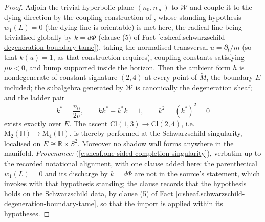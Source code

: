 \documentclass[11pt]{article}
\theoremstyle{definition}
\theoremstyle{plain}
\providecommand{\Cl}{}\renewcommand{\Cl}{\mathrm{Cl}}
\providecommand{\HH}{}\renewcommand{\HH}{\mathbb{H}}
\providecommand{\Mat}{}\renewcommand{\Mat}{\mathrm{M}}
\providecommand{\Mt}{}\renewcommand{\Mt}{\widetilde{M}}
\providecommand{\R}{}\renewcommand{\R}{\mathbb{R}}
\providecommand{\nInf}{}\renewcommand{\nInf}{n_\infty}
\providecommand{\nO}{}\renewcommand{\nO}{n_0}
\providecommand{\shL}{}\renewcommand{\shL}{L}
\providecommand{\shW}{}\renewcommand{\shW}{\mathcal{W}}
\begin{document}
\begin{proof}
Adjoin the trivial hyperbolic plane $(\nO, \nInf)$ to $\shW$ and couple it to the dying direction by the coupling construction of \cite[Def.~4.1]{ButlerT4}, whose standing hypothesis $w_1(\shL) = 0$ (the dying line is orientable) is met here, the radical line being trivialised globally by $k = d\Phi$ (clause (5) of Fact \ref{c:sheaf.schwarzschild-degeneration-boundary-tame}), taking the normalised transversal $u = \partial_t/m$ (so that $k(u) = 1$, as that construction requires), coupling constants satisfying $\mu\nu < 0$, and bump supported inside the horizon. Then the ambient form $h$ is nondegenerate of constant signature $(2,4)$ at every point of $\Mt$, the boundary $E$ included; the subalgebra generated by $\shW$ is canonically the degeneration sheaf; and the ladder pair
\[
k^* = \frac{\nO}{2\nu}, \qquad k k^* + k^* k = 1, \qquad k^2 = (k^*)^2 = 0
\]
exists exactly over $E$. The ascent $\Cl(1,3) \to \Cl(2,4)$, i.e.\ $\Mat_2(\HH) \to \Mat_4(\HH)$, is thereby performed at the Schwarzschild singularity, localised on $E \cong \R \times S^2$. Moreover no shadow wall forms anywhere in the manifold.
\emph{Provenance:} \cite[Thm.~8.12]{ButlerT4} (\ref{c:sheaf.one-sided-completion-singularity}), verbatim up to the recorded notational alignment, with one clause added here: the parenthetical $w_1(\shL) = 0$ and its discharge by $k = d\Phi$ are not in the source's statement, which invokes \cite[Def.~4.1]{ButlerT4} with that hypothesis standing; the clause records that the hypothesis holds on the Schwarzschild data, by clause (5) of Fact \ref{c:sheaf.schwarzschild-degeneration-boundary-tame}, so that the import is applied within its hypotheses.

\end{proof}
\end{document}

